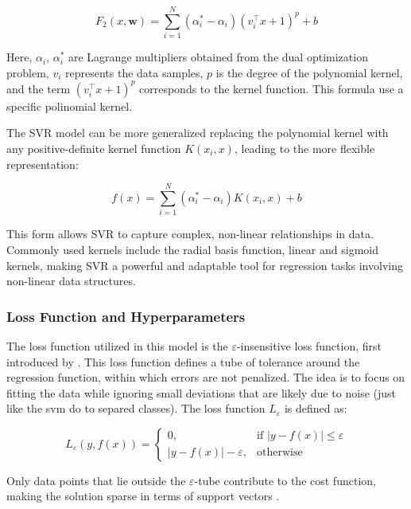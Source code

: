 \documentclass[8pt,twocolumn]{article}
\begin{document}
\begin{equation}
F_2(x, \mathbf{w}) = \sum_{i=1}^{N} (\alpha_i^* - \alpha_i) (v_i^\top x + 1)^p + b
\end{equation}

Here, $\alpha_i$, $\alpha_i^*$ are Lagrange multipliers obtained from the dual optimization
problem, $v_i$ represents the data samples, $p$ is the degree of the polynomial kernel, and the term $(v_i^\top x + 1)^p$ corresponds to the kernel
function. This formula use a specific polinomial kernel.

The SVR model can be more generalized replacing the polynomial kernel with any positive-definite
kernel function $K(x_i, x)$, leading to the more flexible representation:

\begin{equation}
f(x) = \sum_{i=1}^{N} (\alpha_i^* - \alpha_i) K(x_i, x) + b
\end{equation}

This form allows SVR to capture complex, non-linear relationships in data.
Commonly used kernels include the radial basis function, linear and sigmoid kernels,
making SVR a powerful and adaptable tool for regression tasks involving non-linear data structures.

\subsubsection{Loss Function and Hyperparameters}
The loss function utilized in this model is the $\varepsilon$-insensitive loss function, first
introduced by \cite{vapnik1995nature}. This loss function defines a tube of tolerance around the regression function,
within which errors are not penalized. The idea is to focus on fitting the data while ignoring small deviations that
are likely due to noise (just like the svm do to separed classes). The loss function $L_\varepsilon$ is defined as:

\begin{equation}
L_\varepsilon(y, f(x)) = 
\begin{cases}
0, & \text{if } |y - f(x)| \leq \varepsilon \\
|y - f(x)| - \varepsilon, & \text{otherwise}
\end{cases}
\end{equation}

Only data points that lie outside the $\varepsilon$-tube contribute to
the cost function, making the solution sparse in terms of support vectors \cite{smola1998tutorial}.
\end{document}
